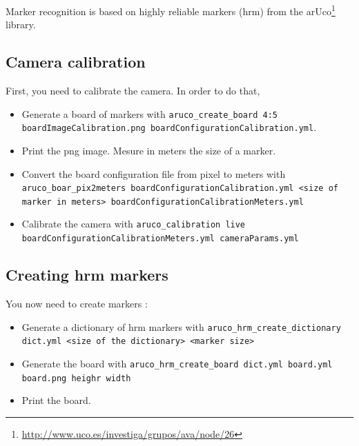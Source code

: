 \documentclass[a4paper,11pt]{report}
\begin{document}
Marker recognition is based on highly reliable markers (hrm) from the
arUco\footnote{\url{http://www.uco.es/investiga/grupos/ava/node/26}}
library.

\subsection{Camera calibration}
\label{subsec:cam}

First, you need to calibrate the camera. In order to do that, \begin{itemize}

    \item Generate a board of markers with \texttt{aruco\_create\_board 4:5
        boardImageCalibration.png boardConfigurationCalibration.yml}.

    \item Print the png image. Mesure in meters the size of a marker.

    \item Convert the board configuration file from pixel to meters with
        \texttt{aruco\_boar\_pix2meters boardConfigurationCalibration.yml <size
        of marker in meters> boardConfigurationCalibrationMeters.yml}

    \item Calibrate the camera with \texttt{aruco\_calibration live
        boardConfigurationCalibrationMeters.yml cameraParams.yml}

\end{itemize}

\subsection{Creating hrm markers}
\label{subsec:dic}

You now need to create markers : \begin{itemize}

    \item Generate a dictionary of hrm markers with
        \texttt{aruco\_hrm\_create\_dictionary dict.yml <size of the
        dictionary> <marker size>}

    \item Generate the board with \texttt{aruco\_hrm\_create\_board dict.yml
        board.yml board.png heighr width}

    \item Print the board.

\end{itemize}
\end{document}
